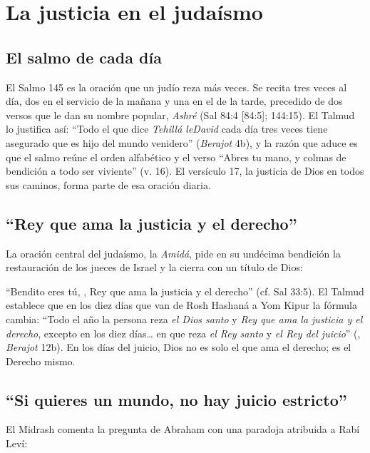 \section{La justicia en el judaísmo}\label{sec:judaismo-justo}


\subsection{El salmo de cada día}
El Salmo 145 es la oración que un judío reza más veces. Se recita tres veces al día, dos en el servicio de la mañana y una en el de la tarde, precedido de dos versos que le dan su nombre popular, \emph{Ashré} (Sal 84:4 [84:5]; 144:15). El Talmud lo justifica así: ``Todo el que dice \emph{Tehillá leDavid} cada día tres veces tiene asegurado que es hijo del mundo venidero'' (\emph{Berajot} 4b), y la razón que aduce es que el salmo reúne el orden alfabético y el verso ``Abres tu mano, y colmas de bendición a todo ser viviente'' (v. 16). El versículo 17, la justicia de Dios en todos sus caminos, forma parte de esa oración diaria.

\subsection{“Rey que ama la justicia y el derecho”}
La oración central del judaísmo, la \emph{Amidá}, pide en su undécima bendición la restauración de los jueces de Israel y la cierra con un título de Dios:


``Bendito eres tú, \SENOR, Rey que ama la justicia y el derecho'' (cf. Sal 33:5). El Talmud establece que en los diez días que van de Rosh Hashaná a Yom Kipur la fórmula cambia: ``Todo el año la persona reza \emph{el Dios santo} y \emph{Rey que ama la justicia y el derecho}, excepto en los diez días\ldots{} en que reza \emph{el Rey santo} y \emph{el Rey del juicio}'' (, \emph{Berajot} 12b). En los días del juicio, Dios no es solo el que ama el derecho; es el Derecho mismo.

\subsection{“Si quieres un mundo, no hay juicio estricto”}
El Midrash comenta la pregunta de Abraham con una paradoja atribuida a Rabí Leví:

